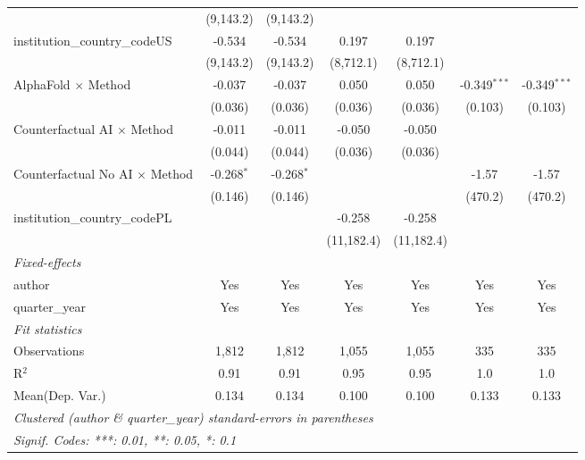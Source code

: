 \begin{tabular}{lcccccc}
                                         & (9,143.2)     & (9,143.2)     &               &               &                &   \\   
   institution\_country\_codeUS          & -0.534        & -0.534        & 0.197         & 0.197         &                &   \\   
                                         & (9,143.2)     & (9,143.2)     & (8,712.1)     & (8,712.1)     &                &   \\   
   AlphaFold $\times$ Method             & -0.037        & -0.037        & 0.050         & 0.050         & -0.349$^{***}$ & -0.349$^{***}$\\   
                                         & (0.036)       & (0.036)       & (0.036)       & (0.036)       & (0.103)        & (0.103)\\   
   Counterfactual AI $\times$ Method     & -0.011        & -0.011        & -0.050        & -0.050        &                &   \\   
                                         & (0.044)       & (0.044)       & (0.036)       & (0.036)       &                &   \\   
   Counterfactual No AI $\times$ Method  & -0.268$^{*}$  & -0.268$^{*}$  &               &               & -1.57          & -1.57\\   
                                         & (0.146)       & (0.146)       &               &               & (470.2)        & (470.2)\\   
   institution\_country\_codePL          &               &               & -0.258        & -0.258        &                &   \\   
                                         &               &               & (11,182.4)    & (11,182.4)    &                &   \\   
   \midrule
   \emph{Fixed-effects}\\
   author                                & Yes           & Yes           & Yes           & Yes           & Yes            & Yes\\  
   quarter\_year                         & Yes           & Yes           & Yes           & Yes           & Yes            & Yes\\  
   \midrule
   \emph{Fit statistics}\\
   Observations                          & 1,812         & 1,812         & 1,055         & 1,055         & 335            & 335\\  
   R$^2$                                 & 0.91          & 0.91          & 0.95          & 0.95          & 1.0            & 1.0\\  
Mean(Dep. Var.) & 0.134 & 0.134 & 0.100 & 0.100 & 0.133 & 0.133 \\
   \midrule \midrule
   \multicolumn{7}{l}{\emph{Clustered (author \& quarter\_year) standard-errors in parentheses}}\\
   \multicolumn{7}{l}{\emph{Signif. Codes: ***: 0.01, **: 0.05, *: 0.1}}\\
\end{tabular}
\par\endgroup
